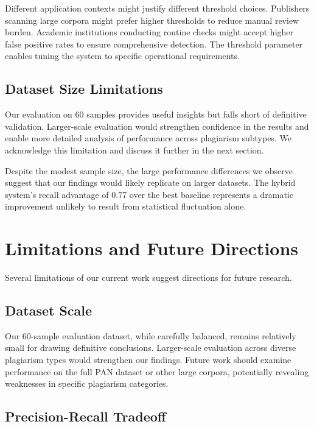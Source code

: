 \documentclass[conference]{IEEEtran}
\begin{document}
Different application contexts might justify different threshold choices. Publishers scanning large corpora might prefer higher thresholds to reduce manual review burden. Academic institutions conducting routine checks might accept higher false positive rates to ensure comprehensive detection. The threshold parameter enables tuning the system to specific operational requirements.

\subsection{Dataset Size Limitations}

Our evaluation on 60 samples provides useful insights but falls short of definitive validation. Larger-scale evaluation would strengthen confidence in the results and enable more detailed analysis of performance across plagiarism subtypes. We acknowledge this limitation and discuss it further in the next section.

Despite the modest sample size, the large performance differences we observe suggest that our findings would likely replicate on larger datasets. The hybrid system's recall advantage of 0.77 over the best baseline represents a dramatic improvement unlikely to result from statistical fluctuation alone.

\section{Limitations and Future Directions}

Several limitations of our current work suggest directions for future research.

\subsection{Dataset Scale}

Our 60-sample evaluation dataset, while carefully balanced, remains relatively small for drawing definitive conclusions. Larger-scale evaluation across diverse plagiarism types would strengthen our findings. Future work should examine performance on the full PAN dataset or other large corpora, potentially revealing weaknesses in specific plagiarism categories.

\subsection{Precision-Recall Tradeoff}
\end{document}
